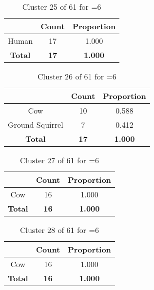 \begin{table}[ht!]
\centering
\begin{tabular}{|c|c|c|}
\hline
\bf \Spec{} &\bf Count &\bf Proportion\\ \hline \hline
Human & 17 & 1.000\\ \hline
\hline
\bf Total & \bf 17 & \bf 1.000\\ \hline
\end{tabular}
\label{tab:cluster:25:6}
\caption{Cluster 25 of 61 for \minneigh{}=6}
\end{table}

\begin{table}[ht!]
\centering
\begin{tabular}{|c|c|c|}
\hline
\bf \Spec{} &\bf Count &\bf Proportion\\ \hline \hline
Cow & 10 & 0.588\\ \hline
Ground Squirrel & 7 & 0.412\\ \hline
\hline
\bf Total & \bf 17 & \bf 1.000\\ \hline
\end{tabular}
\label{tab:cluster:26:6}
\caption{Cluster 26 of 61 for \minneigh{}=6}
\end{table}

\begin{table}[ht!]
\centering
\begin{tabular}{|c|c|c|}
\hline
\bf \Spec{} &\bf Count &\bf Proportion\\ \hline \hline
Cow & 16 & 1.000\\ \hline
\hline
\bf Total & \bf 16 & \bf 1.000\\ \hline
\end{tabular}
\label{tab:cluster:27:6}
\caption{Cluster 27 of 61 for \minneigh{}=6}
\end{table}

\begin{table}[ht!]
\centering
\begin{tabular}{|c|c|c|}
\hline
\bf \Spec{} &\bf Count &\bf Proportion\\ \hline \hline
Cow & 16 & 1.000\\ \hline
\hline
\bf Total & \bf 16 & \bf 1.000\\ \hline
\end{tabular}
\label{tab:cluster:28:6}
\caption{Cluster 28 of 61 for \minneigh{}=6}
\end{table}

